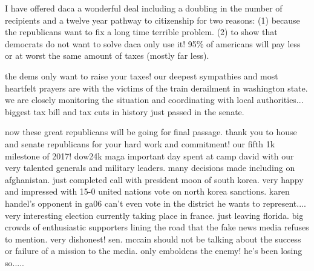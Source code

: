 \documentclass[10pt,twoside,fleqn,english,french]{actuecon}
\author{Jack Dorsey}
\affil{Twitter}
\author{Benoit Hamel}
\affil{Bibliothèque \\ HEC Montréal}
\date{} %
\begin{document}
	
	\setcounter{page}{3}
	
	\maketitle
	\thispagestyle{empty}			
	
	\begin{AEresume}
		I have offered daca a wonderful deal including a doubling in the number of recipients and a twelve year pathway to
		citizenship for two reasons: (1) because the republicans want to fix a long time terrible problem. (2) to show that
		democrats do not want to solve daca only use it! 95\% of americans will pay less or at worst the same amount of taxes
		(mostly far less).	 
	\end{AEresume}

	\begin{AEabstract}
		the dems only want to raise your taxes! our deepest sympathies and most heartfelt prayers are with the victims of the train
		derailment in washington state. we are closely monitoring the situation and coordinating with local authorities... biggest
		tax bill and tax cuts in history just passed in the senate.
	\end{AEabstract}

	\AEintroduction
	
		now these great republicans will be going for final passage. thank you to house and senate republicans for your hard work
		and commitment! our fifth 1k milestone of 2017! dow24k maga important day spent at camp david with our very talented
		generals and military leaders. many decisions made including on afghanistan. just completed call with president moon of
		south korea. very happy and impressed with 15-0 united nations vote on north korea sanctions. karen handel's opponent in
		ga06 can't even vote in the district he wants to represent.... very interesting election currently taking place in france.
		just leaving florida. big crowds of enthusiastic supporters lining the road that the fake news media refuses to mention.
		very dishonest! sen. mccain should not be talking about the success or failure of a mission to the media. only emboldens
		the enemy! he's been losing so.....
		       	
	\AEsectionsDeveloppement
	
\end{document}
